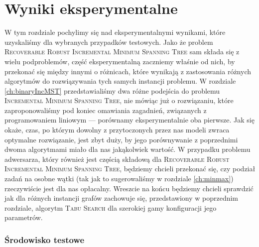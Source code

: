\chapter{Wyniki eksperymentalne}\label{ch:exp}
\thispagestyle{chapterBeginStyle}

W tym rozdziale pochylimy się nad eksperymentalnymi wynikami, które uzyskaliśmy dla wybranych przypadków testowych. Jako że problem \textsc{Recoverable Robust Incremental Minimum Spanning Tree} sam składa się z wielu podproblemów, część eksperymentalną zaczniemy właśnie od nich, by przekonać się między innymi o różnicach, które wynikają z zastosowania różnych algorytmów do rozwiązywania tych samych instancji problemu. W rozdziale \ref{ch:binaryIncMST} przedstawialiśmy dwa różne podejścia do problemu \textsc{Incremental Minimum Spanning Tree}, nie mówiąc już o rozwiązaniu, które zaproponowaliśmy pod koniec omawiania zagadnień, związanych z programowaniem liniowym --- porównamy eksperymentalnie oba pierwsze. Jak się okaże, czas, po którym dowolny z przytoczonych przez nas modeli zwraca optymalne rozwiązanie, jest zbyt duży, by jego porównywanie z poprzednimi dwoma algorytmami miało dla nas jakąkolwiek wartość. W przypadku problemu adwersarza, który również jest częścią składową dla \textsc{Recoverable Robust Incremental Minimum Spanning Tree}, będziemy chcieli przekonać się, czy podział zadań na osobne wątki (tak jak to sugerowaliśmy w rozdziale \ref{ch:minmax}) rzeczywiście jest dla nas opłacalny. Wreszcie na końcu będziemy chcieli sprawdzić jak dla różnych instancji grafów zachowuje się, przedstawiony w poprzednim rozdziale, algorytm \textsc{Tabu Search} dla szerokiej gamy konfiguracji jego parametrów.

\subsection{Środowisko testowe}

